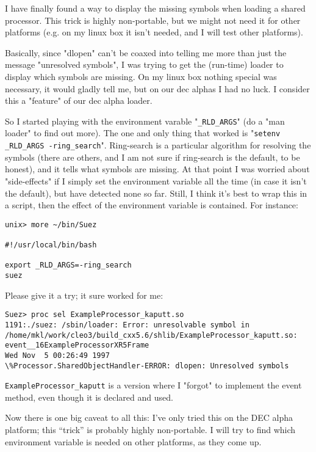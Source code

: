 \documentclass[12pt]{article}
\begin{document}
I have finally found a way to display the missing symbols when loading a
shared processor. This trick is highly non-portable, but we might not
need it for other platforms (e.g. on my linux box it isn't needed, and I
will test other platforms).

Basically, since "dlopen" can't be coaxed into telling me more than just the 
message "unresolved symbols", I was trying to get the (run-time) loader to 
display which symbols are missing. On my linux box nothing special was 
necessary, it would gladly tell me, but on our dec alphas I had no luck. I 
consider this a "feature" of our dec alpha loader.

So I started playing with the environment varable "\verb=_RLD_ARGS=" (do
a "man loader" to find out more).  The one and only thing that worked is
"\verb=setenv _RLD_ARGS -ring_search=".  Ring-search is a particular algorithm
for resolving the symbols (there are others, and I am not sure if
ring-search is the default, to be honest), and it tells what symbols are
missing. At that point I was worried about "side-effects" if I simply
set the environment variable all the time (in case it isn't the
default), but have detected none so far.  Still, I think it's best to
wrap this in a script, then the effect of the environment variable is
contained. For instance:
%
\begin{verbatim}
unix> more ~/bin/Suez

#!/usr/local/bin/bash

export _RLD_ARGS=-ring_search
suez
\end{verbatim}

Please give it a try; it sure worked for me:
%
\begin{verbatim}
Suez> proc sel ExampleProcessor_kaputt.so
1191:./suez: /sbin/loader: Error: unresolvable symbol in 
/home/mkl/work/cleo3/build_cxx5.6/shlib/ExampleProcessor_kaputt.so: 
event__16ExampleProcessorXR5Frame
Wed Nov  5 00:26:49 1997
\%Processor.SharedObjectHandler-ERROR: dlopen: Unresolved symbols
\end{verbatim}
%
\verb=ExampleProcessor_kaputt= is a version where I "forgot" to
implement the event method, even though it is declared and used.

Now there is one big caveat to all this: I've only tried this on the DEC
alpha platform; this ``trick'' is probably highly non-portable. I will
try to find which environment variable is needed on other platforms, as
they come up.

\end{document}
